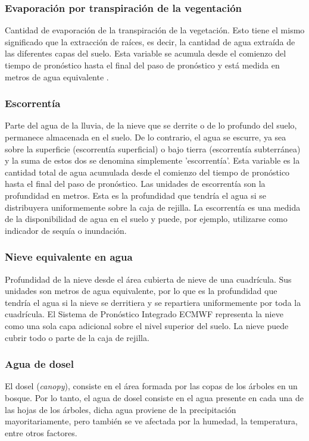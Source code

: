     \subsubsection{Evaporación por transpiración de la vegentación}
    Cantidad de evaporación de la transpiración de la vegetación. Esto tiene el mismo significado que la extracción de raíces, 
    es decir, la cantidad de agua extraída de las diferentes capas del suelo. 
    Esta variable se acumula desde el comienzo del tiempo de pronóstico hasta el final del paso de pronóstico y está medida en metros de agua equivalente \cite{ERA5-L}.

    \subsubsection{Escorrentía}
    Parte del agua de la lluvia, de la nieve que se derrite o de lo profundo del suelo, permanece almacenada en el suelo. De lo contrario, el agua se escurre, ya sea sobre la superficie (escorrentía superficial)
    o bajo tierra (escorrentía subterránea) y la suma de estos dos se denomina simplemente 'escorrentía'. Esta variable es la cantidad total de agua acumulada desde el comienzo del tiempo de pronóstico hasta el 
    final del paso de pronóstico. Las unidades de escorrentía son la profundidad en metros. Esta es la profundidad que tendría el agua si se distribuyera uniformemente sobre la caja de rejilla.
    La escorrentía es una medida de la disponibilidad de agua en el suelo y puede, por ejemplo, utilizarse como indicador de sequía o inundación.

    \subsubsection{Nieve equivalente en agua}
    Profundidad de la nieve desde el área cubierta de nieve de una cuadrícula. Sus unidades son metros de agua equivalente, por lo que es la profundidad que tendría el agua si la nieve se derritiera y se 
    repartiera uniformemente por toda la cuadrícula. El Sistema de Pronóstico Integrado ECMWF representa la nieve como una sola capa adicional sobre el nivel superior del suelo. La nieve puede cubrir todo o parte de la caja de rejilla.

    \subsubsection{Agua de dosel}
    El dosel (\textit{canopy}), consiste en el área formada por las copas de los árboles en un bosque. Por lo tanto, el agua de dosel consiste en el agua presente en cada una de las hojas de los árboles, dicha agua proviene de 
    la precipitación mayoritariamente, pero también se ve afectada por la humedad, la temperatura, entre otros factores.

